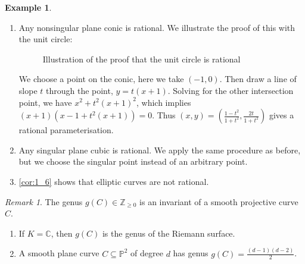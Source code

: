 \documentclass[11pt]{article}
\theoremstyle{definition}
\newtheorem{example}[definition]{Example}
\theoremstyle{plain}
\theoremstyle{remark}
\newtheorem{remark}[definition]{Remark}
\newcommand{\ZZ}{\mathbb{Z}}
\newcommand{\CC}{\mathbb{C}}
\newcommand{\PP}{\mathbb{P}}
\begin{document}
\begin{example}\label{eg:2_2}\phantom{}
    \begin{enumerate}[label=(\alph*)]
        \item Any nonsingular plane conic is rational. We illustrate the proof of this with the unit circle:
            \begin{figure}[htpb]
            \begin{center}
            \end{center}
            \caption{Illustration of the proof that the unit circle is rational}%
            \label{fig:1}
            \end{figure}
            We choose a point on the conic, here we take $(-1, 0)$. Then draw a line of slope $t$ through the point, $y = t(x+1)$. Solving for the other intersection point, we have $x^2 + t^2 (x+1)^2$, which implies $(x+1)(x-1+t^2(x+1)) = 0$. Thus $(x, y) = (\frac{1-t^2}{1+t^2}, \frac{2t}{1+t^2})$ gives a rational parameterisation.

        \item Any singular plane cubic is rational. We apply the same procedure as before, but we choose the singular point instead of an arbitrary point. %

        \item \autoref{cor:1_6} shows that elliptic curves are not rational.
    \end{enumerate}
\end{example}

\begin{remark}\label{rem:2_3}
    The genus $g(C) \in \ZZ_{\ge 0}$ is an invariant of a smooth projective curve $C$.
    \begin{enumerate}
        \item If $K = \CC$, then $g(C)$ is the genus of the Riemann surface.
        \item A smooth plane curve $C \subseteq \PP^2$ of degree $d$ has genus $g(C) = \frac{(d-1)(d-2)}{2}$.
    \end{enumerate}
\end{remark}
\end{document}
